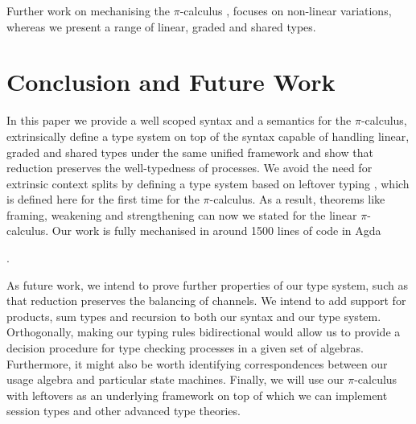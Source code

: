 \documentclass[sigplan,10pt,anonymous,review]{acmart}
\theoremstyle{definition}
\newcommand{\picalc}{$\pi$-calculus}
\begin{document}
Further work on mechanising the \picalc{} \cite{Henry-Gerard1999, Honsell2001a, Bengtson2013, Despeyroux2000, Affeldt2008}, focuses on non-linear variations, whereas we present a range of linear, graded and shared types.

\section{Conclusion and Future Work}

In this paper we provide a well scoped syntax and a semantics for the \picalc{}, extrinsically define a type system on top of the syntax capable of handling linear, graded and shared types under the same unified framework and show that reduction preserves the well-typedness of processes.
We avoid the need for extrinsic context splits by defining a type system based on leftover typing \cite{Allais2018a}, which is defined here for the first time for the \picalc{}.
As a result, theorems like framing, weakening and strengthening can now we stated for the linear \picalc{}.
Our work is fully mechanised in around 1500 lines of code in Agda%
\begin{anonsuppress}
\cite{Zalakain2020Agda}
\end{anonsuppress}
.

As future work, we intend to prove further properties of our type system, such as that reduction preserves the balancing of channels.
We intend to add support for products, sum types and recursion to both our syntax and our type system.
Orthogonally, making our typing rules bidirectional would allow us to provide a decision procedure for type checking processes in a given set of algebras.
Furthermore, it might also be worth identifying correspondences between our usage algebra and particular state machines.
Finally, we will use our \picalc{} with leftovers as an underlying framework on top of which we can implement session types and other advanced type theories.




\appendix

\end{document}
